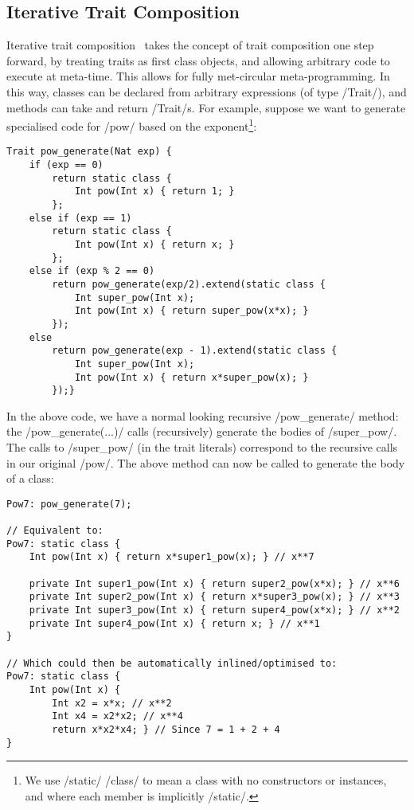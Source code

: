 \subsection{Iterative  Trait Composition}\label{s:bic}
Iterative trait composition~\cite{Servetto:2013:MLA:2426890.2426913} takes the concept of trait composition one step forward, by treating traits as first class objects, and allowing arbitrary code to execute at meta-time. This allows for fully met-circular meta-programming. In this way, classes can be declared from arbitrary expressions (of type /Trait/), and methods can take and return /Trait/s. For example, suppose we want to generate specialised code for /pow/ based on the exponent\footnote{We use /static/ /class/ to mean a class with no constructors or instances, and where each member is implicitly /static/.}:
\begin{lstlisting}
Trait pow_generate(Nat exp) {
	if (exp == 0)
		return static class { 
			Int pow(Int x) { return 1; }
		};
	else if (exp == 1)
		return static class {
			Int pow(Int x) { return x; }
		};
	else if (exp % 2 == 0)
		return pow_generate(exp/2).extend(static class {
			Int super_pow(Int x);
			Int pow(Int x) { return super_pow(x*x); }
		});
	else 
		return pow_generate(exp - 1).extend(static class {
			Int super_pow(Int x);
			Int pow(Int x) { return x*super_pow(x); }
		});}
\end{lstlisting}
In the above code, we have a normal looking recursive /pow_generate/ method: the /pow_generate(...)/ calls (recursively) generate the bodies of /super_pow/. The calls to /super_pow/ (in the trait literals) correspond to the recursive calls in our original /pow/. The above method can now be called to generate the body of a class:
\begin{lstlisting}
Pow7: pow_generate(7);

// Equivalent to:
Pow7: static class {
	Int pow(Int x) { return x*super1_pow(x); } // x**7

	private Int super1_pow(Int x) { return super2_pow(x*x); } // x**6
	private Int super2_pow(Int x) { return x*super3_pow(x); } // x**3
	private Int super3_pow(Int x) { return super4_pow(x*x); } // x**2
	private Int super4_pow(Int x) { return x; } // x**1
}

// Which could then be automatically inlined/optimised to:
Pow7: static class {
	Int pow(Int x) { 
		Int x2 = x*x; // x**2
		Int x4 = x2*x2; // x**4
		return x*x2*x4; } // Since 7 = 1 + 2 + 4
}
\end{lstlisting}
